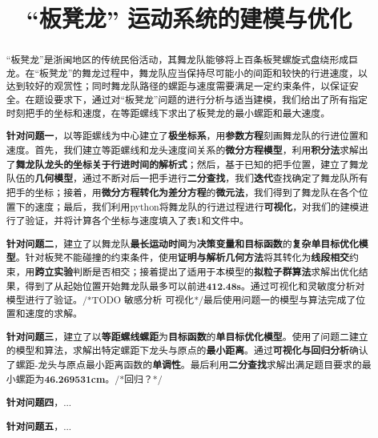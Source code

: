 \documentclass[a4paper]{article}
\title{“板凳龙” 运动系统的建模与优化}
\date{} %
\begin{document}
	\maketitle
	\vspace{-6em} %
	\begin{abstract}
		“板凳龙”是浙闽地区的传统民俗活动，其舞龙队能够将上百条板凳螺旋式盘绕形成巨龙。在“板凳龙”的舞龙过程中，舞龙队应当保持尽可能小的间距和较快的行进速度，以达到较好的观赏性；同时舞龙队路径的螺距与速度需要满足一定约束条件，以保证安全。在题设要求下，通过对“板凳龙”问题的进行分析与适当建模，我们给出了所有指定时刻把手的坐标和速度，在等距螺线下求出了板凳龙的最小螺距和最大速度。

		\hspace{0.2em}\textbf{针对问题一}，以等距螺线为中心建立了\textbf{极坐标系}，用\textbf{参数方程}刻画舞龙队的行进位置和速度。首先，我们建立等距螺线和龙头速度间关系的\textbf{微分方程模型}，利用\textbf{积分法}求解出了\textbf{舞龙队龙头的坐标关于行进时间的解析式}；然后，基于已知的把手位置，建立了舞龙队伍的\textbf{几何模型}，通过不断对后一把手进行\textbf{二分查找}，我们\textbf{迭代}查找确定了舞龙队所有把手的坐标；接着，用\textbf{微分方程转化为差分方程}的\textbf{微元法}，我们得到了舞龙队在各个位置下的速度；最后，我们利用python将舞龙队的行进过程进行\textbf{可视化}，对我们的建模进行了验证，并将计算各个坐标与速度填入了表1和文件中。

		\textbf{针对问题二}，建立了以舞龙队\textbf{最长运动时间}为\textbf{决策变量和目标函数}的\textbf{复杂单目标优化模型}。针对板凳不能碰撞的约束条件，使用\textbf{证明与解析几何方法}将其转化为\textbf{线段相交}约束，用\textbf{跨立实验}判断是否相交；接着提出了适用于本模型的\textbf{拟粒子群算法}求解出优化结果，得到了从起始位置开始舞龙队最多可以前进\textbf{412.48s}。通过可视化和灵敏度分析对模型进行了验证。/*TODO 敏感分析 可视化*/最后使用问题一的模型与算法完成了位置和速度的求解。

		\textbf{针对问题三}，建立了以\textbf{等距螺线螺距}为\textbf{目标函数}的\textbf{单目标优化模型}。使用了问题二建立的模型和算法，求解出特定螺距下龙头与原点的\textbf{最小距离}。通过\textbf{可视化与回归分析}确认了螺距-龙头与原点最小距离函数的\textbf{单调性}。最后利用\textbf{二分查找}求解出满足题目要求的最小螺距为\textbf{46.269531cm}。/*回归？*/

		\textbf{针对问题四}，...

		\textbf{针对问题五}，...\\
		\newline
	\end{abstract}
\end{document}
